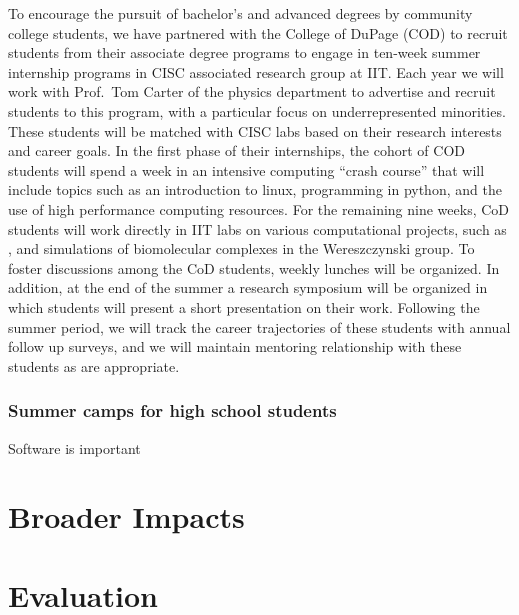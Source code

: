 \documentclass[11pt]{NSFamsart}
\begin{document}
To  encourage the pursuit of bachelor's and advanced degrees by community college students, we have partnered with the College of DuPage (COD) to recruit students from their associate degree programs  to engage in ten-week summer internship programs in CISC associated research group at IIT. Each year we will work with Prof.~Tom Carter of the physics department to advertise and recruit students to this program,  with a particular focus on underrepresented minorities.  These students will be matched with CISC labs based on their research interests and career goals.  In the first phase of their internships, the cohort of COD students will spend a week in an intensive computing ``crash course'' that will include topics such as an introduction to linux, programming in python, and the use of high performance computing resources.  For the remaining nine weeks, CoD students will work directly in IIT labs on various computational projects, such as , and simulations of biomolecular complexes in the Wereszczynski group.  To foster discussions among the CoD students, weekly lunches will be organized.  In addition, at the end of the summer a research symposium will be organized in which students will present a short presentation on their work.  Following the summer period, we will track the career trajectories of these students with annual follow up surveys, and we will maintain mentoring relationship with these students as are appropriate. 



\subsubsection*{Summer camps for high school students}


Software is important \cite{RudEtal18a}

\section{Broader Impacts}
\section{Evaluation}


\newpage
\clearpage
\setcounter{page}{1}



{\renewcommand\addcontentsline[3]{} 
\renewcommand{\refname}{{\Large\textbf{References Cited}}}                   %
\renewcommand{\bibliofont}{\normalsize}

}
\end{document}
